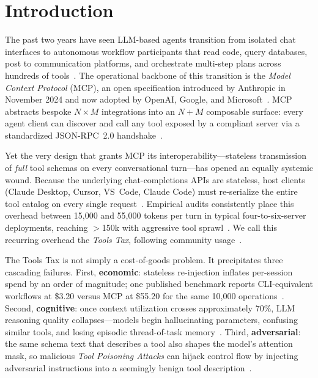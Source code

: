 \documentclass[11pt]{article}
\begin{document}
\section{Introduction}

The past two years have seen LLM-based agents transition from isolated chat interfaces to autonomous workflow participants that read code, query databases, post to communication platforms, and orchestrate multi-step plans across hundreds of tools~\citep{anthropic2024mcp,kaplan2025codeexec,anthropic2025claudecode}. The operational backbone of this transition is the \emph{Model Context Protocol} (MCP), an open specification introduced by Anthropic in November 2024 and now adopted by OpenAI, Google, and Microsoft~\citep{anthropic2024mcp,mcp2025spec}. MCP abstracts bespoke $N \times M$ integrations into an $N + M$ composable surface: every agent client can discover and call any tool exposed by a compliant server via a standardized JSON-RPC~2.0 handshake~\citep{mcp2025spec,jennings2025moqt}.

Yet the very design that grants MCP its interoperability---stateless transmission of \emph{full} tool schemas on every conversational turn---has opened an equally systemic wound. Because the underlying chat-completions APIs are stateless, host clients (Claude Desktop, Cursor, VS~Code, Claude Code) must re-serialize the entire tool catalog on every single request~\citep{pan2026agent}. Empirical audits consistently place this overhead between 15,000 and 55,000 tokens per turn in typical four-to-six-server deployments, reaching $>$150k with aggressive tool sprawl~\citep{pan2026agent,kloski2026mcp,mindstudio2026claudecode}. We call this recurring overhead the \emph{Tools Tax}, following community usage~\citep{pan2026agent,kloski2026mcp}.

The Tools Tax is not simply a cost-of-goods problem. It precipitates three cascading failures. First, \textbf{economic}: stateless re-injection inflates per-session spend by an order of magnitude; one published benchmark reports CLI-equivalent workflows at \$3.20 versus MCP at \$55.20 for the same 10{,}000 operations~\citep{kloski2026mcp,saha2026agentic}. Second, \textbf{cognitive}: once context utilization crosses approximately $70\%$, LLM reasoning quality collapses---models begin hallucinating parameters, confusing similar tools, and losing episodic thread-of-task memory~\citep{pan2026agent,modarressi2025nolima,redis2026contextwindows}. Third, \textbf{adversarial}: the same schema text that describes a tool also shapes the model's attention mask, so malicious \emph{Tool Poisoning Attacks} can hijack control flow by injecting adversarial instructions into a seemingly benign tool description~\citep{wang2025mindguard_v1,wang2026mindguard_v3}.
\end{document}
